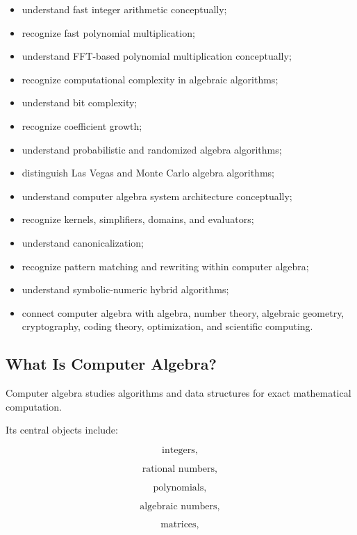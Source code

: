 {\begin{itemize}
    \item understand fast integer arithmetic conceptually;
    \item recognize fast polynomial multiplication;
    \item understand FFT-based polynomial multiplication conceptually;
    \item recognize computational complexity in algebraic algorithms;
    \item understand bit complexity;
    \item recognize coefficient growth;
    \item understand probabilistic and randomized algebra algorithms;
    \item distinguish Las Vegas and Monte Carlo algebra algorithms;
    \item understand computer algebra system architecture conceptually;
    \item recognize kernels, simplifiers, domains, and evaluators;
    \item understand canonicalization;
    \item recognize pattern matching and rewriting within computer algebra;
    \item understand symbolic-numeric hybrid algorithms;
    \item connect computer algebra with algebra, number theory, algebraic
          geometry, cryptography, coding theory, optimization, and
          scientific computing.
\end{itemize}
}

\subsection{What Is Computer Algebra?}
\label{subsec:what-is-computer-algebra}

Computer algebra studies algorithms and data structures for exact
mathematical computation.

Its central objects include:

\[
\boxed{
\text{integers},
}
\]

\[
\boxed{
\text{rational numbers},
}
\]

\[
\boxed{
\text{polynomials},
}
\]

\[
\boxed{
\text{algebraic numbers},
}
\]

\[
\boxed{
\text{matrices},
}
\]

